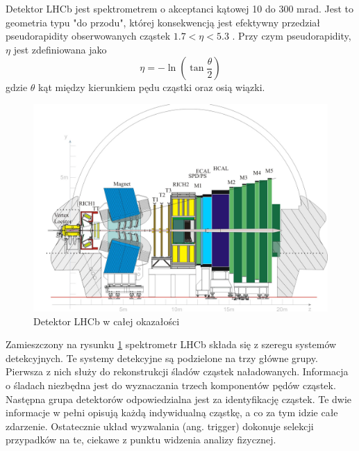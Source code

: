 Detektor LHCb jest spektrometrem o akceptanci kątowej 10 do 300 mrad. Jest to geometria typu "do przodu", której konsekwencją jest efektywny przedział pseudorapidity obserwowanych cząstek $1.7<\eta < 5.3$ . Przy czym pseudorapidity, $\eta $ jest zdefiniowana jako
\begin{equation}
 \eta=-\ln\left(\tan\frac{\theta}{2}\right)
\end{equation}
gdzie $\theta$ kąt między kierunkiem pędu cząstki oraz osią wiązki.


\begin{figure}  \centering
  \includegraphics[scale=0.7]{rozdzial2/Lhcbview.jpg}
  \caption{Detektor LHCb w całej okazałości \cite{public}}
  \label{fig:Layout}
\end{figure}
Zamieszczony na rysunku \ref{fig:Layout} spektrometr LHCb składa się z szeregu systemów detekcyjnych. Te systemy detekcyjne są podzielone na trzy główne grupy. Pierwsza z nich służy do  rekonstrukcji śladów cząstek naładowanych. Informacja o śladach niezbędna jest do wyznaczania trzech komponentów pędów cząstek. Następna grupa detektorów odpowiedzialna jest za identyfikację cząstek. Te dwie informacje w pełni opisują każdą indywidualną cząstkę, a co za tym idzie całe zdarzenie. Ostatecznie układ wyzwalania (ang. trigger) dokonuje selekcji przypadków na te, ciekawe z punktu widzenia analizy fizycznej. 

